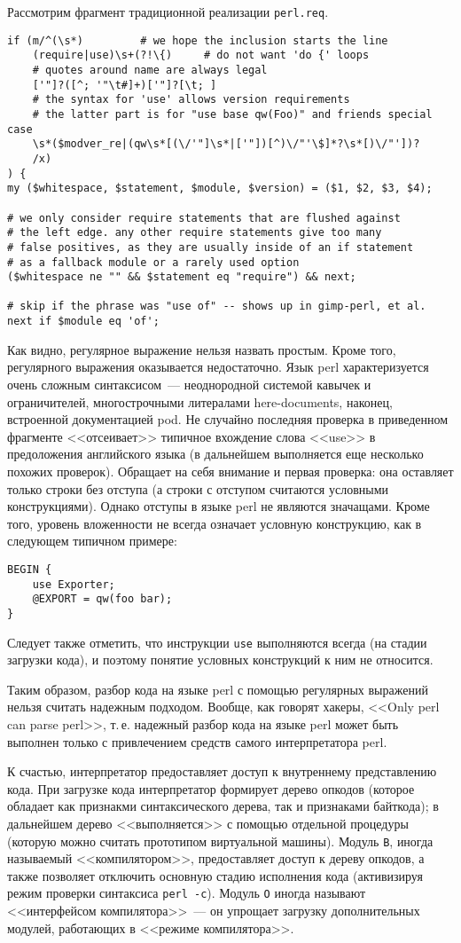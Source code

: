 \documentclass[russian,a4paper,12pt,titlepage]{article}
\begin{document}
Рассмотрим фрагмент традиционной реализации \verb|perl.req|.
\begin{verbatim}
if (m/^(\s*)         # we hope the inclusion starts the line
    (require|use)\s+(?!\{)     # do not want 'do {' loops
    # quotes around name are always legal
    ['"]?([^; '"\t#]+)['"]?[\t; ]
    # the syntax for 'use' allows version requirements
    # the latter part is for "use base qw(Foo)" and friends special case
    \s*($modver_re|(qw\s*[(\/'"]\s*|['"])[^)\/"'\$]*?\s*[)\/"'])?
    /x)
) {
my ($whitespace, $statement, $module, $version) = ($1, $2, $3, $4);

# we only consider require statements that are flushed against
# the left edge. any other require statements give too many
# false positives, as they are usually inside of an if statement
# as a fallback module or a rarely used option
($whitespace ne "" && $statement eq "require") && next;

# skip if the phrase was "use of" -- shows up in gimp-perl, et al.
next if $module eq 'of';
\end{verbatim}
Как видно, регулярное выражение нельзя назвать простым.  Кроме того, регулярного выражения оказывается недостаточно.
Язык perl характеризуется очень сложным синтаксисом~--- неоднородной системой кавычек и ограничителей, многострочными
литералами here-documents, наконец, встроенной документацией pod.  Не случайно последняя проверка в приведенном фрагменте
<<отсеивает>> типичное вхождение слова <<use>> в предоложения английского языка (в дальнейшем выполняется еще несколько
похожих проверок).  Обращает на себя внимание и первая проверка: она оставляет только строки без отступа (а строки с отступом
считаются условными конструкциями).  Однако отступы в языке perl не являются значащами.  Кроме того, уровень вложенности
не всегда означает условную конструкцию, как в следующем типичном примере:
\begin{verbatim}
BEGIN {
    use Exporter;
    @EXPORT = qw(foo bar);
}
\end{verbatim}
Следует также отметить, что инструкции \verb|use| выполняются всегда (на стадии загрузки кода),
и поэтому понятие условных конструкций к ним не относится.

Таким образом, разбор кода на языке perl с помощью регулярных выражений нельзя считать надежным подходом.
Вообще, как говорят хакеры, <<Only perl can parse perl>>, т.\,е. надежный разбор кода на языке perl
может быть выполнен только с привлечением средств самого интерпретатора perl.

К счастью, интерпретатор предоставляет доступ к внутреннему представлению кода.  При загрузке кода
интерпретатор формирует дерево опкодов (которое обладает как признакми синтаксического дерева,
так и признаками байткода); в дальнейшем дерево <<выполняется>> с помощью отдельной процедуры (которую
можно считать прототипом виртуальной машины).  Модуль \verb|B|, иногда называемый <<компилятором>>,
предоставляет доступ к дереву опкодов, а также позволяет отключить основную стадию исполнения кода
(активизируя режим проверки синтаксиса \texttt{perl -c}).  Модуль \verb|O| иногда называют <<интерфейсом
компилятора>>~--- он упрощает загрузку дополнительных модулей, работающих в <<режиме компилятора>>.
\end{document}
